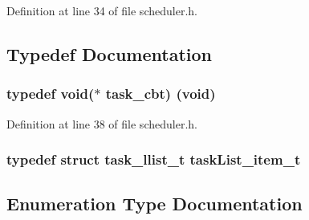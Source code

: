 Definition at line 34 of file scheduler.\+h.



\subsection{Typedef Documentation}
\subsubsection[{\texorpdfstring{task\+\_\+cbt}{task_cbt}}]{\setlength{\rightskip}{0pt plus 5cm}typedef {\bf void}($\ast$ task\+\_\+cbt) ({\bf void})}\hypertarget{group___scheduler_gad18d3f32b9193516d5f1849adc9d434e}{}\label{group___scheduler_gad18d3f32b9193516d5f1849adc9d434e}


Definition at line 38 of file scheduler.\+h.

\subsubsection[{\texorpdfstring{task\+List\+\_\+item\+\_\+t}{taskList_item_t}}]{\setlength{\rightskip}{0pt plus 5cm}typedef struct {\bf task\+\_\+llist\+\_\+t}  {\bf task\+List\+\_\+item\+\_\+t}}\hypertarget{group___scheduler_ga35a54119c3c60da01e15fb98e49f582b}{}\label{group___scheduler_ga35a54119c3c60da01e15fb98e49f582b}


\subsection{Enumeration Type Documentation}
